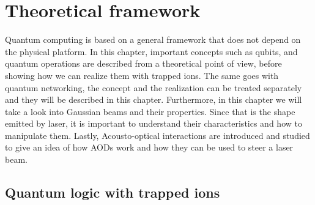 
\chapter{Theoretical framework}
Quantum computing is based on a general framework that does not depend on the physical platform. In this chapter, important concepts such as qubits, and quantum operations are described from a theoretical point of view, before showing how we can realize them with trapped ions. The same goes with quantum networking, the concept and the realization can be treated separately and they will be described in this chapter. Furthermore, in this chapter we will take a look into Gaussian beams and their properties. Since that is the shape emitted by laser, it is important to understand their characteristics and how to manipulate them. Lastly, Acousto-optical interactions are introduced and studied to give an idea of how AODs work and how they can be used to steer a laser beam.
\section{Quantum logic with trapped ions}
